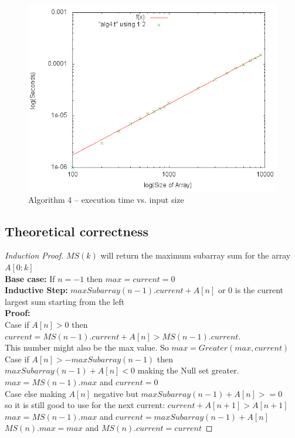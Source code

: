 \documentclass[a4paper,10pt]{article}
\begin{document}
		\begin{figure}[!htb]
			\centering
			\includegraphics[scale=.5]{timingfiles/alg4plotlog.png}
			\caption{Algorithm 4 -- execution time vs. input size}
			\label{fig:alg4}
		\end{figure}


\begin{samepage}
	\section{Theoretical correctness}
		\begin{proof}[Induction Proof]
			$MS(k)$ will return the maximum subarray sum for the array $A[0:k]$\\
			\textbf{Base case:} If $n = -1$ then $max = current = 0$\\
			\textbf{Inductive Step:} $maxSubarray(n-1).current + A[n]$ or 0 is the current largest sum starting from the left\\
			\textbf{Proof:}\\ 
			Case if $A[n] > 0$ then $current = MS(n-1).current + A[n] > MS(n-1).current$. \\
			\indent This number might also be the max value. So $max = Greater(max,current)$\\
			Case if $A[n] >  - maxSubarray(n-1)$ then $maxSubarray(n-1) + A[n] < 0$ making the Null set greater.\\
			\indent $max = MS(n-1).max$ and $current = 0$ \\
			Case else making $A[n]$ negative but $maxSubarray(n-1) + A[n] >= 0$\\
			\indent so it is still good to use for the next current: $current + A[n+1] > A[n+1]$\\
			\indent $max = MS(n-1).max$ and $current = maxSubarray(n-1) + A[n]$\\
			$MS(n).max = max$ and $MS(n).current = current$
			 
		\end{proof}
\end{samepage} 
\end{document}
